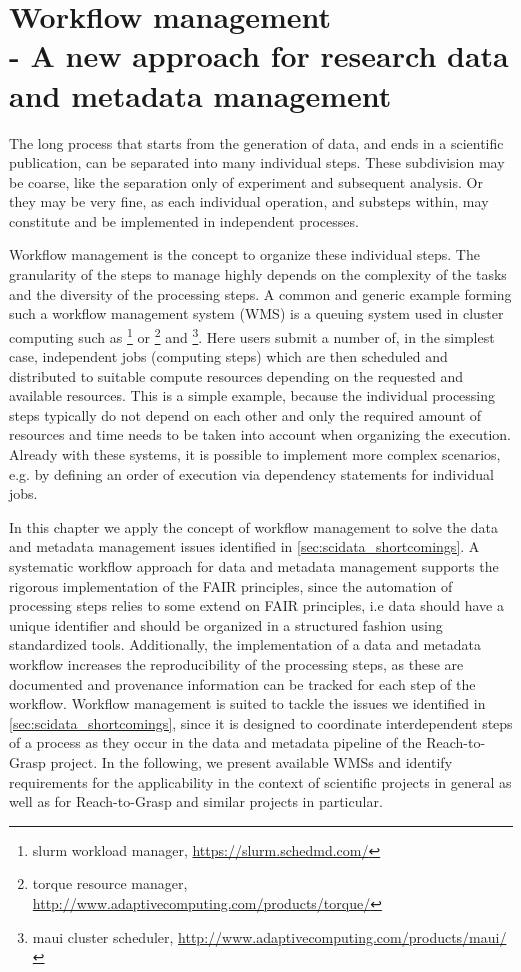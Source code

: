 \cleardoublepage
\chapter[Workflow management]{Workflow management\\- A new approach for research data and metadata management}
\label{sec:workflows}
The long process that starts from the generation of data, and ends in a scientific publication, can be separated into many individual steps. These subdivision may be coarse, like the separation only of experiment and subsequent analysis. Or they may be very fine, as each individual operation, and substeps within, may constitute and be implemented in independent processes.

Workflow management is the concept to organize these individual steps. The granularity of the steps to manage highly depends on the complexity of the tasks and the diversity of the processing steps. A common and generic example forming such a workflow management system (WMS) is a queuing system used in cluster computing such as \footnote{slurm workload manager, \url{https://slurm.schedmd.com/}} or  \footnote{torque resource manager, \url{http://www.adaptivecomputing.com/products/torque/}} and \footnote{maui cluster scheduler, \url{http://www.adaptivecomputing.com/products/maui/}}. Here users submit a number of, in the simplest case, independent jobs (computing steps) which are then scheduled and distributed to suitable compute resources depending on the requested and available resources. This is a simple example, because the individual processing steps typically do not depend on each other and only the required amount of resources and time needs to be taken into account when organizing the execution. Already with these systems, it is possible to implement more complex scenarios, e.g. by defining an order of execution via dependency statements for individual jobs.

In this chapter we apply the concept of workflow management to solve the data and metadata management issues identified in \cref{sec:scidata_shortcomings}. A systematic workflow approach for data and metadata management supports the rigorous implementation of the FAIR principles, since the automation of processing steps relies to some extend on FAIR principles, i.e data should have a unique identifier and should be organized in a structured fashion using standardized tools. Additionally, the implementation of a data and metadata workflow increases the reproducibility of the processing steps, as these are documented and provenance information can be tracked for each step of the workflow. Workflow management is suited to tackle the issues we identified in \cref{sec:scidata_shortcomings}, since it is designed to coordinate interdependent steps of a process as they occur in the data and metadata pipeline of the Reach-to-Grasp project. In the following, we present available WMSs and identify requirements for the applicability in the context of scientific projects in general as well as for Reach-to-Grasp and similar projects in particular.

